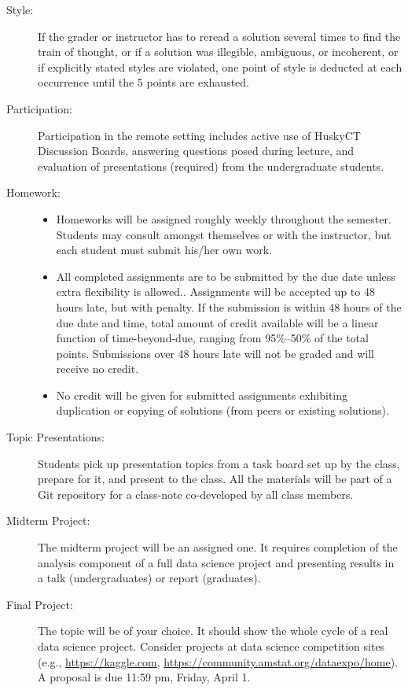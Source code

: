\documentclass{article}
\begin{document}
\begin{multicols}{2}
\begin{description}
\item[Style:]
  If the grader or instructor has to reread a solution several times
  to find the train of thought, or if a solution was illegible,
  ambiguous, or incoherent, or if explicitly stated styles are
  violated, one point of style is deducted at each occurrence until
  the 5 points are exhausted.

\item[Participation:]  Participation in the remote setting includes
  active use of HuskyCT Discussion Boards, answering questions posed
  during lecture, and evaluation of presentations (required) from the
  undergraduate students.

\item[Homework:]\hspace{0pt}
\begin{itemize}
\item Homeworks will be assigned roughly weekly throughout the
  semester.  Students may consult amongst themselves or with the
  instructor, but each student must submit his/her own work.
  
\item All completed assignments are to be submitted by the due date
  unless extra flexibility is allowed.. 
Assignments will be accepted up to 48 hours late, but with penalty.  If the
submission is within 48 hours of the due date and time, total amount of credit
available will be a linear function of time-beyond-due, ranging from 95\%--50\%
of the total points. Submissions over 48 hours late will not be graded and will
receive no credit.
		
\item No credit will be given for submitted assignments exhibiting
  duplication or copying of solutions (from peers or existing
  solutions).
\end{itemize}

\item[Topic Presentations:]
  Students pick up presentation topics from a task board set up by the
  class, prepare for it, and present to the class. All the materials will be part
  of a Git repository for a class-note co-developed by all class members.

\item[Midterm Project:]
  The midterm project will be an assigned one. It requires completion
  of the analysis component of a full data science project
  and presenting results in a talk (undergraduates) or report (graduates).
  
\item[Final Project:]
  The topic will be of your choice. It should show
  the whole cycle of a real data science project. Consider projects at
  data science competition sites (e.g., \url{https://kaggle.com},
  \url{https://community.amstat.org/dataexpo/home}).
  A proposal is due 11:59 pm, Friday, April 1.


\end{description}
\end{multicols}
\end{document}
